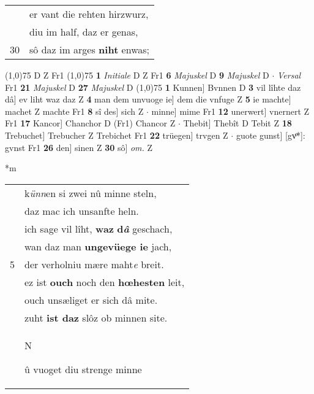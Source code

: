 \documentclass[8pt,a4paper,notitlepage]{article}
\begin{document}
\begin{table}[ht]
\begin{minipage}[t]{0.5\linewidth}
\begin{tabular}{rl}
 & er vant die rehten hirzwurz,\\ 
 & diu im half, daz er genas,\\ 
30 & sô daz im arges \textbf{niht} enwas;\\ 
\end{tabular}
\scriptsize
\line(1,0){75} \newline
D Z Fr1 \newline
\line(1,0){75} \newline
\textbf{1} \textit{Initiale} D Z Fr1  \textbf{6} \textit{Majuskel} D  \textbf{9} \textit{Majuskel} D   $\cdot$ \textit{Versal} Fr1  \textbf{21} \textit{Majuskel} D  \textbf{27} \textit{Majuskel} D  \newline
\line(1,0){75} \newline
\textbf{1} Kunnen] Bvnnen D \textbf{3} vil lîhte daz dâ] ev liht waz daz Z \textbf{4} man dem unvuoge ie] dem die vnfuge Z \textbf{5} ie machte] machet Z machte Fr1 \textbf{8} sî des] sich Z  $\cdot$ minne] mime Fr1 \textbf{12} unerwert] vnernert Z Fr1 \textbf{17} Kancor] Chanchor D (Fr1) Chancor Z  $\cdot$ Thebit] Thebît D Tebit Z \textbf{18} Trebuchet] Trebucher Z Trebichet Fr1 \textbf{22} trüegen] trvgen Z  $\cdot$ guote gunst] [gvͦ*]: gvnst Fr1 \textbf{26} den] sinen Z \textbf{30} sô] \textit{om.} Z \newline
\end{minipage}
\hspace{0.5cm}
\begin{minipage}[t]{0.5\linewidth}
\small
\begin{center}*m
\end{center}
\begin{tabular}{rl}
 & k\textit{ünn}en si zwei nû minne steln,\\ 
 & daz mac ich unsanfte heln.\\ 
 & ich sage vil lîht, \textbf{waz} \textbf{d\textit{â}} geschach,\\ 
 & wan daz man \textbf{ungevüege ie} jach,\\ 
5 & der verholniu mære maht\textit{e} breit.\\ 
 & ez ist \textbf{ouch} noch den \textbf{hœhesten} leit,\\ 
 & ouch unsæliget er sich dâ mite.\\ 
 & zuht \textbf{ist daz} slôz ob minnen site.\\ 
 & \begin{large}N\end{large}û vuoget diu strenge minne\\ 

\end{tabular}
\end{minipage}
\end{table}
\end{document}
